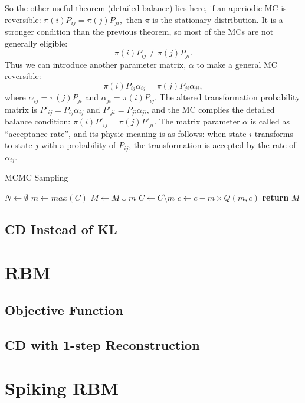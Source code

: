 \documentclass[11pt,twoside,a4paper]{article}
\begin{document}
	So the other useful theorem (detailed balance) lies here, if an aperiodic MC is reversible: $\pi (i) P_{ij} = \pi (j) P_{ji},$ then $ \pi $ is the stationary distribution.
	It is a stronger condition than the previous theorem, so most of the MCs are not generally eligible:
	\begin{equation}
	\pi (i) P_{ij} \neq \pi (j) P_{ji}.
	\end{equation}
	Thus we can introduce another parameter matrix, $ \alpha $ to make a general MC reversible:
	\begin{equation}
	\pi (i) P_{ij} \alpha_{ij} = \pi (j) P_{ji} \alpha_{ji}	,
	\end{equation}
	where $ \alpha_{ij} = \pi(j) P_{ji} $ and $ \alpha_{ji} = \pi(i) P_{ij}$.
	The altered transformation probability matrix is $ P'_{ij} =  P_{ij} \alpha_{ij}$ and $ P'_{ji} =  P_{ji} \alpha_{ji}$, and the MC complies the detailed balance condition: $\pi (i) P'_{ij} = \pi (j) P'_{ji}$.
	The matrix parameter $ \alpha $ is called as ``acceptance rate'', and its physic meaning is as follows: when state $ i $ transforms to state $ j $ with a probability of $ P_{ij} $, the transformation is accepted by the rate of $ \alpha_{ij} $.
	\begin{algorithm}[h]
	  \caption{MCMC Sampling}
	  \label{alg:mcmc}
	  \begin{algorithmic}
	    \State $N \leftarrow \emptyset$ 
	    \Repeat
	    \State $m \leftarrow max(C)$
	    \State $M \leftarrow M \cup m$
	    \State $C \leftarrow C \setminus m$
	     
	     
	    \State $c \leftarrow c - m \times Q(m, c)$
	    \EndIf
	    \EndFor
	    \State \textbf{return} $M$
	    \EndProcedure
	  \end{algorithmic}
	\end{algorithm}
\subsection{CD Instead of KL}
\section{RBM\cite{zhang2013rbm}}
\subsection{Objective Function}
\subsection{CD with 1-step Reconstruction}
\section{Spiking RBM\cite{neftci2013event}}

 

\end{document}
